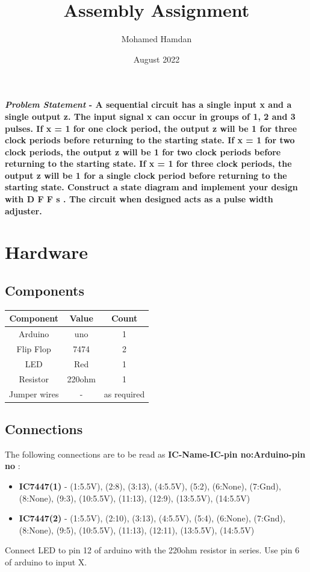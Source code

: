 \documentclass[journal,10pt,twocolumn]{article}
\title{\textbf{Assembly Assignment}}
\author{Mohamed Hamdan}
\date{August 2022}
\begin{document}
\maketitle
\paragraph{\textit{Problem Statement} - A sequential circuit has a single input x and a single output z. The input signal x can occur in groups of 1, 2 and 3 pulses. If x = 1 for one clock period, the output z will be 1 for three clock periods before returning to the starting state. If x = 1 for two clock periods, the output z will be 1 for two clock periods before returning to the starting state. If x = 1 for three clock periods, the output z will be 1 for a single clock period before returning to the starting state. Construct a state diagram and implement your design with D F F s . The circuit when designed acts as a pulse width adjuster.
}

\section*{\large Hardware}
\subsection*{\normalsize Components}
{
\centering
\begin{tabular}{|c|c|c|}
\hline
Component&Value&Count\\
\hline
Arduino&uno&1\\
\hline
Flip Flop&7474&2\\
\hline
LED&Red&1\\
\hline
Resistor&220ohm&1\\
\hline
Jumper wires&-&as required\\
\hline
\end{tabular}\par
}
\subsection*{\normalsize Connections}
The following connections are to be read as \textbf{IC-Name-IC-pin no:Arduino-pin no} :
\begin{itemize}
\item \textbf{IC7447(1)} - (1:5.5V), (2:8), (3:13), (4:5.5V), (5:2), (6:None), (7:Gnd), (8:None), (9:3), (10:5.5V), (11:13), (12:9), (13:5.5V), (14:5.5V)
\item \textbf{IC7447(2)} - (1:5.5V), (2:10), (3:13), (4:5.5V), (5:4), (6:None), (7:Gnd), (8:None), (9:5), (10:5.5V), (11:13), (12:11), (13:5.5V), 
 (14:5.5V)
\end{itemize}
Connect LED to pin 12 of arduino with the 220ohm resistor in series. Use pin 6 of arduino to input X.
\end{document}
